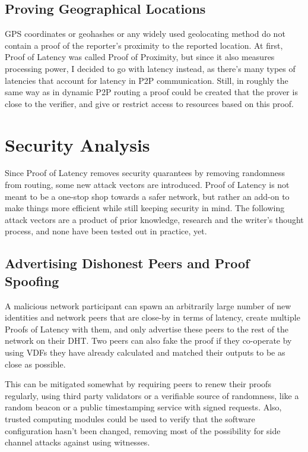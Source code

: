 \subsection{Proving Geographical Locations}
GPS coordinates or geohashes or any widely used geolocating method do not contain a proof of the reporter's proximity to the reported location. At first, Proof of Latency was called Proof of Proximity, but since it also measures processing power, I decided to go with latency instead, as there's many types of latencies that account for latency in P2P communication. Still, in roughly the same way as in dynamic P2P routing a proof could be created that the prover is close to the verifier, and give or restrict access to resources based on this proof.

\section{Security Analysis}
Since Proof of Latency removes security quarantees by removing randomness from routing, some new attack vectors are introduced. Proof of Latency is not meant to be a one-stop shop towards a safer network, but rather an add-on to make things more efficient while still keeping security in mind. The following attack vectors are a product of prior knowledge, research and the writer's thought process, and none have been tested out in practice, yet.

\subsection{Advertising Dishonest Peers and Proof Spoofing}
A malicious network participant can spawn an arbitrarily large number of new identities and network peers that are close-by in terms of latency, create multiple Proofs of Latency with them, and only advertise these peers to the rest of the network on their DHT. Two peers can also fake the proof if they co-operate by using VDFs they have already calculated and matched their outputs to be as close as possible.

This can be mitigated somewhat by requiring peers to renew their proofs regularly, using third party validators or a verifiable source of randomness, like a random beacon or a public timestamping service with signed requests. Also, trusted computing modules could be used to verify that the software configuration hasn't been changed, removing most of the possibility for side channel attacks against using witnesses.

